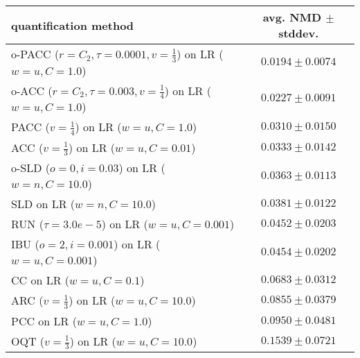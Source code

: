 \begin{tabular}{lc}
  \toprule
  quantification method & avg. NMD $\pm$ stddev. \\
  \midrule
  o-PACC ($r=C_2, \tau=0.0001, v=\frac{1}{3}$) on LR ($w=u, C=1.0$) & $\mathbf{0.0194 \pm 0.0074}$ \\
  o-ACC ($r=C_2, \tau=0.003, v=\frac{1}{4}$) on LR ($w=u, C=1.0$) & $0.0227 \pm 0.0091$ \\
  PACC ($v=\frac{1}{4}$) on LR ($w=u, C=1.0$) & $0.0310 \pm 0.0150$ \\
  ACC ($v=\frac{1}{3}$) on LR ($w=u, C=0.01$) & $0.0333 \pm 0.0142$ \\
  o-SLD ($o=0, i=0.03$) on LR ($w=n, C=10.0$) & $0.0363 \pm 0.0113$ \\
  SLD on LR ($w=n, C=10.0$) & $0.0381 \pm 0.0122$ \\
  RUN ($\tau=3.0e-5$) on LR ($w=u, C=0.001$) & $0.0452 \pm 0.0203$ \\
  IBU ($o=2, i=0.001$) on LR ($w=u, C=0.001$) & $0.0454 \pm 0.0202$ \\
  CC on LR ($w=u, C=0.1$) & $0.0683 \pm 0.0312$ \\
  ARC ($v=\frac{1}{3}$) on LR ($w=u, C=10.0$) & $0.0855 \pm 0.0379$ \\
  PCC on LR ($w=u, C=1.0$) & $0.0950 \pm 0.0481$ \\
  OQT ($v=\frac{1}{3}$) on LR ($w=u, C=10.0$) & $0.1539 \pm 0.0721$ \\
  \bottomrule
\end{tabular}
